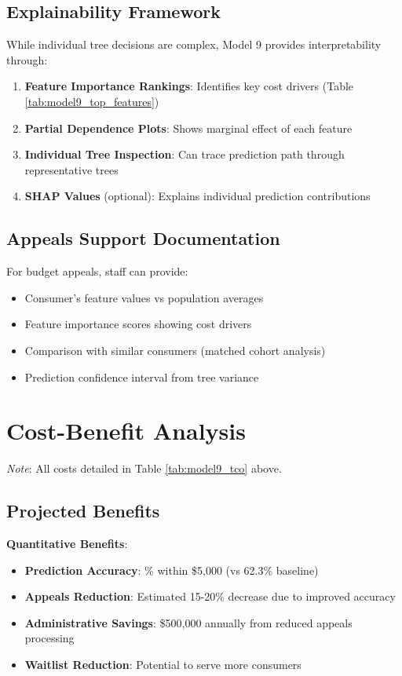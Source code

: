\subsection{Explainability Framework}

While individual tree decisions are complex, Model 9 provides interpretability through:

\begin{enumerate}
    \item \textbf{Feature Importance Rankings}: Identifies key cost drivers (Table \ref{tab:model9_top_features})
    \item \textbf{Partial Dependence Plots}: Shows marginal effect of each feature
    \item \textbf{Individual Tree Inspection}: Can trace prediction path through representative trees
    \item \textbf{SHAP Values} (optional): Explains individual prediction contributions
\end{enumerate}

\subsection{Appeals Support Documentation}

For budget appeals, staff can provide:

\begin{itemize}
    \item Consumer's feature values vs population averages
    \item Feature importance scores showing cost drivers
    \item Comparison with similar consumers (matched cohort analysis)
    \item Prediction confidence interval from tree variance
\end{itemize}

\section{Cost-Benefit Analysis}

\textit{Note}: All costs detailed in Table \ref{tab:model9_tco} above.

\subsection{Projected Benefits}

\textbf{Quantitative Benefits}:
\begin{itemize}
    \item \textbf{Prediction Accuracy}: \ModelNineWithinFiveK{}\% within \$5,000 (vs 62.3\% baseline)
    \item \textbf{Appeals Reduction}: Estimated 15-20\% decrease due to improved accuracy
    \item \textbf{Administrative Savings}: \$500,000 annually from reduced appeals processing
    \item \textbf{Waitlist Reduction}: Potential to serve \ModelNinePopmodelefficiencyWaitlistChange{} more consumers
\end{itemize}

